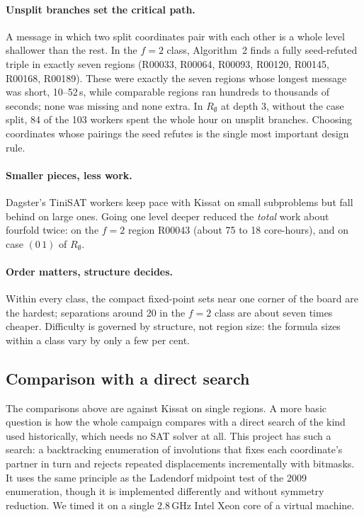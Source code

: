 \documentclass[11pt,a4paper]{article}
\theoremstyle{definition}
\begin{document}
\paragraph{Unsplit branches set the critical path.} A message in which two split coordinates
pair with each other is a whole level shallower than the rest. In the $f=2$ class, Algorithm~2
finds a fully seed-refuted triple in exactly seven regions (R00033, R00064, R00093, R00120,
R00145, R00168, R00189). These were exactly the seven regions whose longest message was short,
10--52\,s, while comparable regions ran hundreds to thousands of seconds; none was missing and
none extra. In $R_\emptyset$ at depth 3, without the case split, 84 of the 103 workers spent
the whole hour on unsplit branches. Choosing coordinates whose pairings the seed refutes is
the single most important design rule.

\paragraph{Smaller pieces, less work.} Dagster's TiniSAT workers keep pace with Kissat on
small subproblems but fall behind on large ones. Going one level deeper reduced the
\emph{total} work about fourfold twice: on the $f=2$ region R00043 (about 75 to 18
core-hours), and on case $(0\,1)$ of $R_\emptyset$.

\paragraph{Order matters, structure decides.} Within every class, the compact fixed-point
sets near one corner of the board are the hardest; separations around 20 in the $f=2$ class
are about seven times cheaper. Difficulty is governed by structure, not region size: the
formula sizes within a class vary by only a few per cent.

\subsection{Comparison with a direct search}\label{sec:direct}

The comparisons above are against Kissat on single regions. A more basic question is how the whole
campaign compares with a direct search of the kind used historically, which needs no SAT solver at
all. This project has such a search: a backtracking enumeration of involutions that fixes each
coordinate's partner in turn and rejects repeated displacements incrementally with bitmasks. It
uses the same principle as the Ladendorf midpoint test of the 2009 enumeration, though it is
implemented differently and without symmetry reduction. We timed it on a single 2.8\,GHz Intel Xeon
core of a virtual machine.
\end{document}
